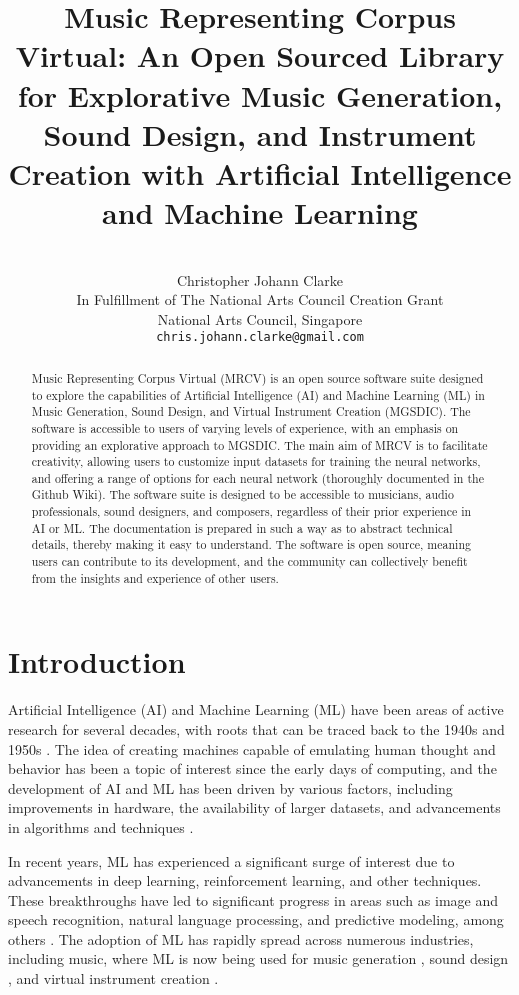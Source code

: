 \documentclass{article}
\title{Music Representing Corpus Virtual: An Open Sourced Library for Explorative Music Generation, Sound Design, and Instrument Creation with Artificial Intelligence and Machine Learning}
\author{\\
	{Christopher Johann Clarke} \\
	In Fulfillment of The National Arts Council Creation Grant\\
	National Arts Council, Singapore\\
	\texttt{chris.johann.clarke@gmail.com} \\
}
\begin{document}
\maketitle

\begin{abstract}
	Music Representing Corpus Virtual (MRCV) is an open source software suite designed to explore the capabilities of Artificial Intelligence (AI) and Machine Learning (ML) in Music Generation, Sound Design, and Virtual Instrument Creation (MGSDIC). The software is accessible to users of varying levels of experience, with an emphasis on providing an explorative approach to MGSDIC. The main aim of MRCV is to facilitate creativity, allowing users to customize input datasets for training the neural networks, and offering a range of options for each neural network (thoroughly documented in the Github Wiki). The software suite is designed to be accessible to musicians, audio professionals, sound designers, and composers, regardless of their prior experience in AI or ML. The documentation is prepared in such a way as to abstract technical details, thereby making it easy to understand. The software is open source, meaning users can contribute to its development, and the community can collectively benefit from the insights and experience of other users.
\end{abstract}




\section{Introduction}
\label{sec:intro}
Artificial Intelligence (AI) and Machine Learning (ML) have been areas of active research for several decades, with roots that can be traced back to the 1940s and 1950s \citep{wilson2011affect}. The idea of creating machines capable of emulating human thought and behavior has been a topic of interest since the early days of computing, and the development of AI and ML has been driven by various factors, including improvements in hardware, the availability of larger datasets, and advancements in algorithms and techniques \citep{lu2018brain}.

In recent years, ML has experienced a significant surge of interest due to advancements in deep learning, reinforcement learning, and other techniques. These breakthroughs have led to significant progress in areas such as image and speech recognition, natural language processing, and predictive modeling, among others \citep{howard2019artificial}. The adoption of ML has rapidly spread across numerous industries, including music, where ML is now being used for music generation \citep{kaliakatsos2020artificial}, sound design \citep{miranda1995artificial}, and virtual instrument creation \citep{tahirouglu2020terity}.
\end{document}
